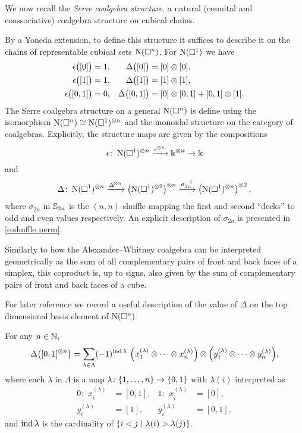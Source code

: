 We now recall the \textit{Serre coalgebra structure}, a natural (counital and coassociative) coalgebra structure on cubical chains.

By a Yoneda extension, to define this structure it suffices to describe it on the chains of representable cubical sets $\operatorname{N}(\square^n)$.
For $\operatorname{N}(\square^1)$ we have
\begin{align*}
	\epsilon \big([0]\big) &= 1,
	& \Delta \big([0]\big) &= [0] \otimes [0], \\
	\epsilon \big([1]\big) &= 1,
	& \Delta \big([1]\big) &= [1] \otimes [1], \\
	\epsilon \big([0,1]\big) &= 0,
	& \Delta \big([0,1]\big) &= [0] \otimes [0,1] + [0,1] \otimes [1].
\end{align*}
The Serre coalgebra structure on a general $\operatorname{N}(\square^n)$ is define using the isomorphism $\operatorname{N}(\square^n) \cong \operatorname{N}(\square^1)^{\otimes n}$ and the monoidal structure on the category of coalgebras.
Explicitly, the structure maps are given by the compositions
\[
\epsilon \colon \operatorname{N}(\square^1)^{\otimes n} \xrightarrow{\epsilon^{\otimes n}} \Bbbk^{\otimes n} \to \Bbbk
\]
and
\[
\Delta \colon \operatorname{N}(\square^1)^{\otimes n} \xrightarrow{\Delta^{\!\otimes n}} \left( \operatorname{N}(\square^1)^{\otimes 2} \right)^{\otimes n} \xrightarrow{\sigma_{2n}^{-1}} \left( \operatorname{N}(\square^1)^{\otimes n} \right)^{\otimes 2},
\]
where $\sigma_{2n}$ in $\mathbb{S}_{2n}$ is the $(n,n)$-shuffle mapping the first and second ``decks'' to odd and even values respectively.
An explicit description of $\sigma_{2n}$ is presented in \cref{e:shuffle perm}.

\begin{remark*}
	Similarly to how the Alexander--Whitney coalgebra can be interpreted geometrically as the sum of all complementary pairs of front and back faces of a simplex, this coproduct is, up to signs, also given by the sum of complementary pairs of front and back faces of a cube.
\end{remark*}

For later reference we record a useful description of the value of $\Delta$ on the top dimensional basis element of $\operatorname{N}(\square^n)$.

\begin{lemma} \label{l:coproduct description}
	For any $n \in \mathbb{N}$,
	\[
	\Delta \big( [0,1]^{\otimes n} \big) =
	\sum_{\lambda \in \Lambda} (-1)^{\operatorname{ind} \lambda} \
	\Big(x_1^{(\lambda)} \otimes \cdots \otimes x_n^{(\lambda)}\Big) \otimes
	\Big(y_1^{(\lambda)} \otimes \cdots \otimes y_n^{(\lambda)}\Big),
	\]
	where each $\lambda$ in $\Lambda$ is a map $\lambda \colon \{1,\dots,n\} \to \{0, 1\}$ with $\lambda(i)$ interpreted as
	\begin{align*}
		0:\ \, x_i^{(\lambda)} &= [0,1], &	1: \ \, x_i^{(\lambda)} &= [0], \\
		y_i^{(\lambda)} &= [1],  & y_i^{(\lambda)} &= [0,1],
	\end{align*}
	and $\operatorname{ind} \lambda$ is the cardinality of $\{i<j \mid \lambda(i) > \lambda(j)\}$.
\end{lemma}

